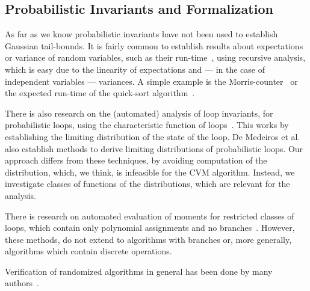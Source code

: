 \subsection{Probabilistic Invariants and Formalization}
As far as we know probabilistic invariants have not been used to establish Gaussian tail-bounds.
It is fairly common to establish results about expectations or variance of random variables, such as their run-time~\cite[Section 1.4]{motwani1995}, using recursive analysis, which is easy due to the linearity of expectations and --- in the case of independent variables --- variances.
A simple example is the Morris-counter~\cite{morris1978} or the expected run-time of the quick-sort algorithm~\cite[Section 2.5]{mitzenmacher2005}.

There is also research on the (automated) analysis of loop invariants, for probabilistic loops, using the characteristic function of loops~\cite{batz2023, mciver2005}.
This works by establishing the limiting distribution of the state of the loop.
De Medeiros et al.~\cite[Section 3.2]{demedeiros2024} also establish methods to derive limiting distributions of probabilistic loops.
Our approach differs from these techniques, by avoiding computation of the distribution, which, we think, is infeasible for the CVM algorithm.
Instead, we investigate classes of functions of the distributions, which are relevant for the analysis.

There is research on automated evaluation of moments for restricted classes of loops, which contain only polynomial assignments and no branches~\cite{bartocci2019,kofnov2022}.
However, these methods, do not extend to algorithms with branches or, more generally, algorithms which contain discrete operations.

Verification of randomized algorithms in general has been done by many authors~\cite{bosshard2024, eberl2020, karayel2022, karayel2023, Probabilistic_Prime_Tests-AFP, tan2024}.
